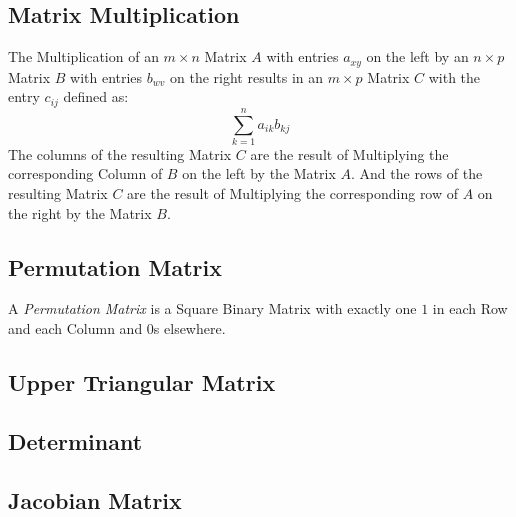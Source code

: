 \subsection{Matrix Multiplication}\label{sec:matrix_multiplication}

The Multiplication of an $m \times n$ Matrix $A$ with entries $a_{xy}$
on the left by an $n \times p$ Matrix $B$ with entries $b_{wv}$ on the
right results in an $m \times p$ Matrix $C$ with the entry $c_{ij}$
defined as:
\[
  \sum_{k=1}^n a_{ik} b_{kj}
\]
The columns of the resulting Matrix $C$ are the result of Multiplying
the corresponding Column of $B$ on the left by the Matrix $A$. And the
rows of the resulting Matrix $C$ are the result of Multiplying the
corresponding row of $A$ on the right by the Matrix $B$.



\subsection{Permutation Matrix}\label{sec:permutation_matrix}

A \emph{Permutation Matrix} is a Square Binary Matrix with exactly one
$1$ in each Row and each Column and $0$s elsewhere.



\subsection{Upper Triangular Matrix}\label{sec:upper_triangular}

\subsection{Determinant}\label{sec:determinant}

\subsection{Jacobian Matrix}\label{sec:jacobian_matrix}



